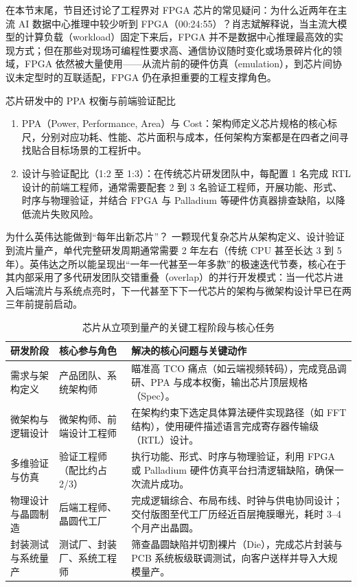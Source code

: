 \documentclass[UTF8,a4paper,11pt,fontset=fandol]{ctexart}
\begin{document}
在本节末尾，节目还讨论了工程界对 FPGA 芯片的常见疑问：为什么近两年在主流 AI 数据中心推理中较少听到 FPGA（00:24:55）？肖志斌解释说，当主流大模型的计算负载（workload）固定下来后，FPGA 并不是数据中心推理最高效的实现方式；但在那些对现场可编程性要求高、通信协议随时变化或场景碎片化的领域，FPGA 依然被大量使用——从流片前的硬件仿真（emulation），到芯片间协议未定型时的互联适配，FPGA 仍在承担重要的工程支撑角色。

\begin{importantbox}{芯片研发中的 PPA 权衡与前端验证配比}
\begin{enumerate}
\item PPA（Power, Performance, Area）与 Cost：架构师定义芯片规格的核心标尺，分别对应功耗、性能、芯片面积与成本，任何架构方案都是在四者之间寻找贴合目标场景的工程折中。
\item 设计与验证配比（1:2 至 1:3）：在传统芯片研发团队中，每配置 1 名完成 RTL 设计的前端工程师，通常需要配套 2 到 3 名验证工程师，开展功能、形式、时序与物理验证，并结合 FPGA 与 Palladium 等硬件仿真器排查缺陷，以降低流片失败风险。
\end{enumerate}
\end{importantbox}
\begin{knowledgebox}{为什么英伟达能做到“每年出新芯片”？}
一颗现代复杂芯片从架构定义、设计验证到流片量产，单代完整研发周期通常需要 2 年左右（传统 CPU 甚至长达 3 到 5 年）。英伟达之所以能呈现出“一年一代甚至一年多款”的极速迭代节奏，核心在于其内部采用了多代研发团队交错重叠（overlap）的并行开发模式：当一代芯片进入后端流片与系统点亮时，下一代甚至下下一代芯片的架构与微架构设计早已在两三年前提前启动。
\end{knowledgebox}
\begin{table}[H]\centering\small
\caption{芯片从立项到量产的关键工程阶段与核心任务}
\begin{tabular}{>{\raggedright\arraybackslash}p{\dimexpr(\linewidth-6\tabcolsep)/3\relax}>{\raggedright\arraybackslash}p{\dimexpr(\linewidth-6\tabcolsep)/3\relax}>{\raggedright\arraybackslash}p{\dimexpr(\linewidth-6\tabcolsep)/3\relax}}
\toprule
研发阶段 & 核心参与角色 & 解决的核心问题与关键动作\\\midrule
需求与架构定义 & 产品团队、系统架构师 & 瞄准高 TCO 痛点（如云端视频转码），完成竞品调研、PPA 与成本权衡，输出芯片顶层规格（Spec）。\\[4pt]
微架构与逻辑设计 & 微架构师、前端设计工程师 & 在架构约束下选定具体算法硬件实现路径（如 FFT 结构），使用硬件描述语言完成寄存器传输级（RTL）设计。\\[4pt]
多维验证与仿真 & 验证工程师（配比约占 2/3） & 执行功能、形式、时序与物理验证，利用 FPGA 或 Palladium 硬件仿真平台扫清逻辑缺陷，确保一次流片成功。\\[4pt]
物理设计与晶圆制造 & 后端工程师、晶圆代工厂 & 完成逻辑综合、布局布线、时钟与供电协同设计；交付版图至代工厂历经近百层掩膜曝光，耗时 3–4 个月产出晶圆。\\[4pt]
封装测试与系统量产 & 测试厂、封装厂、系统工程师 & 筛查晶圆缺陷并切割裸片（Die），完成芯片封装与 PCB 系统板级联调测试，向客户送样并导入大规模量产。\\[4pt]
\bottomrule\end{tabular}\end{table}
\end{document}
